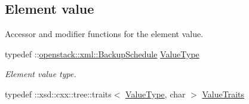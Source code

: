 \subsection*{Element value}
\label{_amgrp2ee2eae1a8c390ea033f241c027da8d6}
Accessor and modifier functions for the element value. \begin{DoxyCompactItemize}
\item 
\hypertarget{classopenstack_1_1xml_1_1BackupSchedule___a4b891a7e5d81f899329172ccc1c386ad}{
typedef ::\hyperlink{classopenstack_1_1xml_1_1BackupSchedule}{openstack::xml::BackupSchedule} \hyperlink{classopenstack_1_1xml_1_1BackupSchedule___a4b891a7e5d81f899329172ccc1c386ad}{ValueType}}
\label{classopenstack_1_1xml_1_1BackupSchedule___a4b891a7e5d81f899329172ccc1c386ad}

\begin{DoxyCompactList}\small\item\em Element value type. \item\end{DoxyCompactList}\item 
\hypertarget{classopenstack_1_1xml_1_1BackupSchedule___a0bb647c4a3dc126c66a03d458497e52b}{
typedef ::xsd::cxx::tree::traits$<$ \hyperlink{classopenstack_1_1xml_1_1BackupSchedule}{ValueType}, char $>$ \hyperlink{classopenstack_1_1xml_1_1BackupSchedule___a0bb647c4a3dc126c66a03d458497e52b}{ValueTraits}}
\label{classopenstack_1_1xml_1_1BackupSchedule___a0bb647c4a3dc126c66a03d458497e52b}


\end{DoxyCompactItemize}
